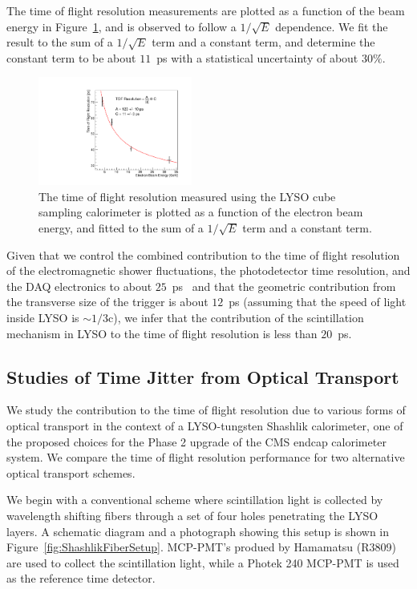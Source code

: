 \documentclass[12pt]{article}
\begin{document}
The time of flight resolution measurements are plotted as a function of the
beam energy in Figure~\ref{fig:LYSOCubeTOFResolutionVsEnergy}, and is observed
to follow a $1/\sqrt{E}$ dependence. We fit the result to the sum of a 
$1/\sqrt{E}$ term and a constant term, and determine the constant term to
be about $11$~ps with a statistical uncertainty of about $30\%$. 

\begin{figure}[h] \centering
\includegraphics[width=0.45\textwidth]{figs/TimeResolutionVsEnergy_CrystalCube} 
\caption{ The time of flight resolution measured using the LYSO cube
sampling calorimeter is plotted as a function of the electron beam energy, 
and fitted to the sum of a $1/\sqrt{E}$ term and a constant term. }
\label{fig:LYSOCubeTOFResolutionVsEnergy}
\end{figure}

Given that we control the combined contribution to the time of flight
resolution of the electromagnetic shower
fluctuations, the photodetector time resolution, and the DAQ electronics
to about $25$~ps~\cite{MCPFastCaloNIMA} and that the geometric contribution 
from the transverse size of the trigger is about $12$~ps (assuming that
the speed of light inside LYSO is $\sim1/3$c),
we infer that the contribution of the scintillation mechanism in LYSO
to the time of flight resolution is less than $20$~ps.


\subsection{Studies of Time Jitter from Optical Transport}

We study the contribution to the time of flight resolution due to
various forms of optical transport in the context of a LYSO-tungsten Shashlik
calorimeter, one of the proposed choices for the Phase 2 upgrade of the
CMS endcap calorimeter system. We compare the time of flight resolution
performance for two alternative optical transport schemes. 

We begin with a conventional scheme where scintillation light is collected
by wavelength shifting fibers through a set of four holes penetrating 
the LYSO layers. A schematic diagram and a photograph showing this setup 
is shown in Figure~\ref{fig:ShashlikFiberSetup}. 
MCP-PMT's produed by Hamamatsu (R3809) are used to collect 
the scintillation light, while a Photek 240 MCP-PMT is used as the reference 
time detector. 
\end{document}
